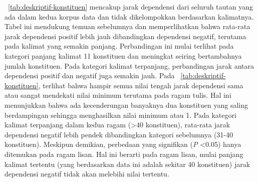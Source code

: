 \documentclass[10pt, a4paper, conference, compsocconf]{IEEEtran}
\begin{document}
 \tab~\ref{tab:deskriptif-konstituen} mencakup jarak dependensi dari seluruh tautan yang ada dalam kedua korpus data dan tidak dikelompokkan berdasarkan kalimatnya. Tabel ini mendukung temuan sebelumnya dan memperlihatkan bahwa rata-rata jarak dependensi positif lebih jauh dibandingkan dependensi negatif, terutama pada kalimat yang semakin panjang. Perbandingan ini mulai terlihat pada kategori panjang kalimat 11 konstituen dan meningkat seiring bertambahnya jumlah konstituen. Pada kategori kalimat terpanjang, perbandingan jarak antara dependensi positif dan negatif juga semakin jauh. Pada \tab~\ref{tab:deskriptif-konstituen}, terlihat bahwa hampir semua nilai tengah jarak dependensi sama atau sangat mendekati nilai minimum terutama pada ragam tulis. Hal ini menunjukkan bahwa ada kecenderungan banyaknya dua konstituen yang saling berdampingan sehingga menghasilkan nilai minimum atau 1. Pada kategori kalimat terpanjang dalam kedua ragam (\textgreater 40 konstituen), rata-rata jarak dependensi negatif lebih pendek dibandingkan kategori sebelumnya (31-40 konstituen). Meskipun demikian, perbedaan yang signifikan (\textit{P} \textless 0.05) hanya ditemukan pada ragam lisan. Hal ini berarti pada ragam lisan, mulai panjang kalimat tertentu (yang berdasarkan data ini adalah sekitar 40 konstituen) jarak dependensi negatif tidak akan melebihi nilai tertentu. 
\end{document}
